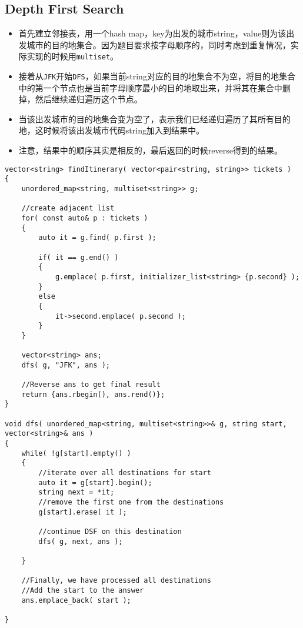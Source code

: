 \subsection{Depth First Search}
\begin{itemize}
\item 首先建立邻接表，用一个hash map，key为出发的城市string，value则为该出发城市的目的地集合。因为题目要求按字母顺序的，同时考虑到重复情况，实际实现的时候用\texttt{multiset}。
\item 接着从\texttt{JFK}开始\texttt{DFS}，如果当前string对应的目的地集合不为空，将目的地集合中的第一个节点也是当前字母顺序最小的目的地取出来，并将其在集合中删掉，然后继续递归遍历这个节点。
\item 当该出发城市的目的地集合变为空了，表示我们已经递归遍历了其所有目的地，这时候将该出发城市代码string加入到结果中。
\item 注意，结果中的顺序其实是相反的，最后返回的时候reverse得到的结果。
\end{itemize}
\setcounter{lstlisting}{0}
\begin{lstlisting}[style=customc, caption={Depth First Search}]
vector<string> findItinerary( vector<pair<string, string>> tickets )
{
    unordered_map<string, multiset<string>> g;

    //create adjacent list
    for( const auto& p : tickets )
    {
        auto it = g.find( p.first );

        if( it == g.end() )
        {
            g.emplace( p.first, initializer_list<string> {p.second} );
        }
        else
        {
            it->second.emplace( p.second );
        }
    }

    vector<string> ans;
    dfs( g, "JFK", ans );

    //Reverse ans to get final result
    return {ans.rbegin(), ans.rend()};
}

void dfs( unordered_map<string, multiset<string>>& g, string start, vector<string>& ans )
{
    while( !g[start].empty() )
    {
        //iterate over all destinations for start
        auto it = g[start].begin();
        string next = *it;
        //remove the first one from the destinations
        g[start].erase( it );

        //continue DSF on this destination
        dfs( g, next, ans );

    }

    //Finally, we have processed all destinations
    //Add the start to the answer
    ans.emplace_back( start );

}
\end{lstlisting}

